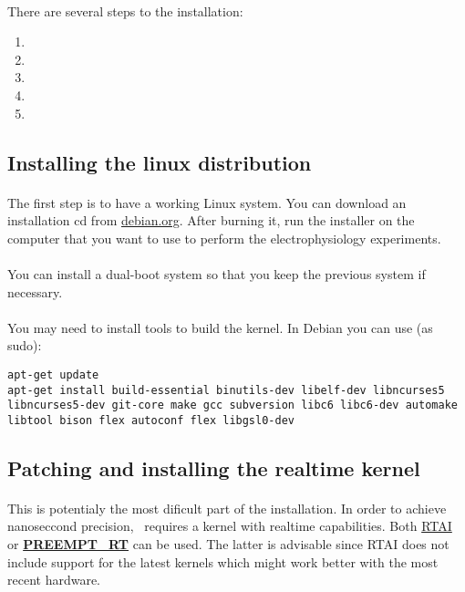 \paragraph{}
There are several steps to the installation:

\begin{enumerate}
	\item {}
	\item {}
	\item {}
	\item {}
	\item {}
\end{enumerate}

\subsection{Installing the linux distribution} 
\label{install:linux}
\paragraph{}
The first step is to have a working Linux system. 
You can download an installation cd from \href{http://www.debian.org/distrib}{debian.org}. After burning it, run the installer on the computer that you want to use to perform the electrophysiology experiments. 
\paragraph{}
You can install a dual-boot system so that you keep the previous system if necessary.
\paragraph{}
You may need to install tools to build the kernel. In Debian you can use (as sudo):
\begin{lstlisting}
apt-get update
apt-get install build-essential binutils-dev libelf-dev libncurses5 libncurses5-dev git-core make gcc subversion libc6 libc6-dev automake libtool bison flex autoconf flex libgsl0-dev 
\end{lstlisting}

\subsection{Patching and installing the realtime kernel} 
\label{install:kernel}
\paragraph{}
This is potentialy the most dificult part of the installation. In order to achieve nanoseccond precision, \progname\ requires a kernel with realtime capabilities. Both \href{http://www.rtai.org}{RTAI} or \textbf{\href{https://rt.wiki.kernel.org/index.php/Main\_Page}{PREEMPT\_RT}} can be used. The latter is advisable since RTAI does not include support for the latest kernels which might work better with the most recent hardware.

